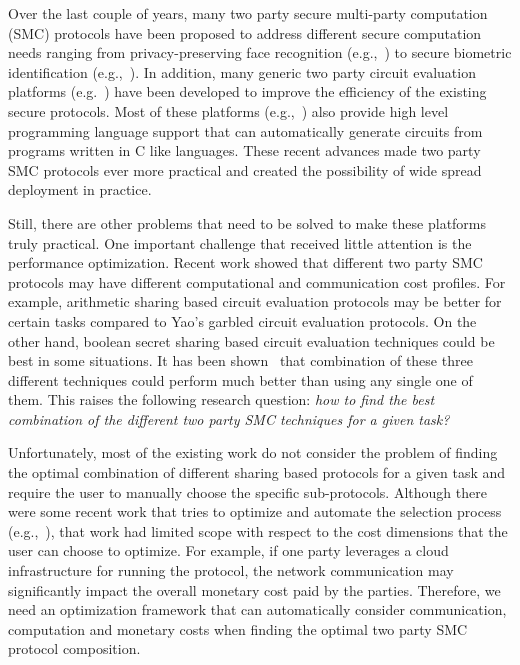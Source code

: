 \documentclass{llncs}
\begin{document}
Over the last couple of years, many two party secure multi-party computation (SMC)  protocols have been  proposed to address different secure computation needs ranging from privacy-preserving face recognition (e.g.,~\cite{cite:sadeghi2010efficient}) to secure biometric identification (e.g.,~\cite{cite:evans2011efficient}). 
In addition, many generic two party circuit evaluation platforms (e.g.~\cite{cite:henecka2010tasty, cite:bogdanov2008sharemind}) have been developed to improve the efficiency of the existing secure protocols.  Most of these platforms (e.g.,~\cite{cite:malkhi2004fairplay}) also provide  high level programming language support that can automatically generate circuits from programs written in C like languages. These recent advances made two party SMC protocols ever more practical and created the possibility of wide spread deployment in practice. 

Still, there are other problems that need to be solved to make these platforms truly practical. One important challenge that received little attention is the performance optimization. Recent work \cite{cite:demmler2015aby} showed that different two party SMC protocols may have different computational and communication cost profiles. For example,  arithmetic sharing based circuit evaluation protocols may be better for certain tasks compared to Yao's garbled circuit evaluation protocols. On the other hand, boolean secret sharing based circuit evaluation techniques could be best in some situations. It has been shown~\cite{cite:demmler2015aby} that  combination of these three different techniques could perform much better than using any single one of them.  This raises the following research question: \textit{how to find the best combination of the different two party SMC techniques for a given task?}

Unfortunately, most of the existing work do not consider the problem of finding the optimal combination of different sharing based protocols for a given task and require the user to manually choose the specific sub-protocols. Although there were some recent work that tries to optimize and automate the selection process (e.g.,~\cite{cite:kerschbaum2014automatic}), that work had limited scope with respect to the cost dimensions that the user can choose to optimize. For example, if one party leverages a cloud infrastructure for running the protocol, the network communication may significantly impact the overall monetary cost paid by the parties. Therefore, we need an optimization framework that can automatically consider communication, computation and monetary costs when finding the optimal two party SMC protocol composition.
\end{document}
